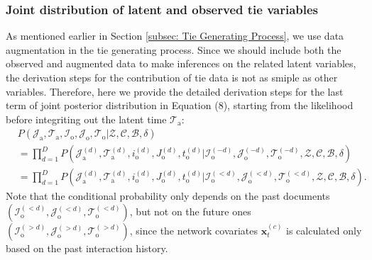 \documentclass[a4paper]{article}
\begin{document}
  	     \subsubsection{Joint distribution of latent and observed tie variables}\label{subsubsec:Joint distribution of Tie}
  	       As mentioned earlier in Section \ref{subsec: Tie Generating Process}, we use data augmentation in the tie generating process. Since we should include both the observed and augmented data to make inferences on the related latent variables, the derivation steps for the contribution of tie data is not as smiple as other variables. Therefore, here we provide the detailed derivation steps for the last term of joint posterior distribution in Equation (8), starting from the likelihood before integriting out the latent time $\mathcal{T}_{\mbox{a}}$: 
  	       \begin{equation}
  	       \begin{aligned}
  	       &P(\mathcal{J}_{\mbox{a}}, \mathcal{T}_{\mbox{a}},\mathcal{I}_{\mbox{o}}, \mathcal{J}_{\mbox{o}}, \mathcal{T}_{\mbox{o}} |\mathcal{Z}, \mathcal{C}, \mathcal{B}, \delta)
  	       \\& = \prod_{d=1}^D P(\mathcal{J}^{(d)}_{\mbox{a}}, \mathcal{T}^{(d)}_{\mbox{a}}, i^{(d)}_{\mbox{o}}, J^{(d)}_{\mbox{o}}, t^{(d)}_{\mbox{o}} |\mathcal{I}^{(-d)}_{\mbox{o}}, \mathcal{J}^{(-d)}_{\mbox{o}}, \mathcal{T}^{(-d)}_{\mbox{o}},\mathcal{Z}, \mathcal{C}, \mathcal{B}, \delta)
  	       \\& = \prod_{d=1}^D P(\mathcal{J}^{(d)}_{\mbox{a}}, \mathcal{T}^{(d)}_{\mbox{a}}, i^{(d)}_{\mbox{o}}, J^{(d)}_{\mbox{o}}, t^{(d)}_{\mbox{o}} |\mathcal{I}^{(<d)}_{\mbox{o}}, \mathcal{J}^{(<d)}_{\mbox{o}}, \mathcal{T}^{(<d)}_{\mbox{o}},\mathcal{Z}, \mathcal{C}, \mathcal{B}, \delta).
  	       \end{aligned}
  	       \end{equation}
  	       Note that the conditional probability only depends on the past documents $(\mathcal{I}^{(<d)}_{\mbox{o}}, \mathcal{J}^{(<d)}_{\mbox{o}}, \mathcal{T}^{(<d)}_{\mbox{o}})$, but not on the future ones $(\mathcal{I}^{(>d)}_{\mbox{o}}, \mathcal{J}^{(>d)}_{\mbox{o}}, \mathcal{T}^{(>d)}_{\mbox{o}})$, since the network covariates $\boldsymbol{x}_t^{(c)}$ is calculated only based on the past interaction history. \\ \newline
\end{document}
